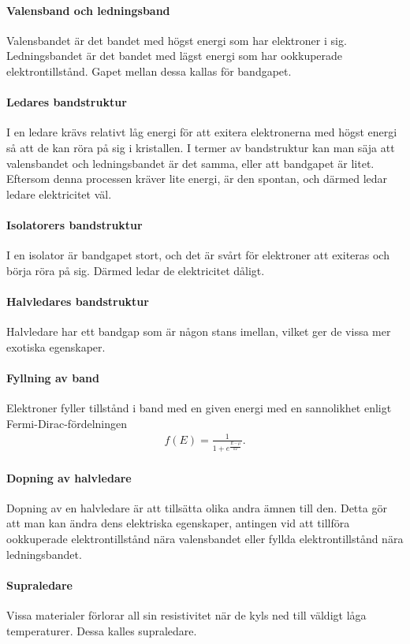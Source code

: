 \paragraph{Valensband och ledningsband}
Valensbandet är det bandet med högst energi som har elektroner i sig. Ledningsbandet är det bandet med lägst energi som har ookkuperade elektrontillstånd. Gapet mellan dessa kallas för bandgapet.

\paragraph{Ledares bandstruktur}
I en ledare krävs relativt låg energi för att exitera elektronerna med högst energi så att de kan röra på sig i kristallen. I termer av bandstruktur kan man säja att valensbandet och ledningsbandet är det samma, eller att bandgapet är litet. Eftersom denna processen kräver lite energi, är den spontan, och därmed ledar ledare elektricitet väl.

\paragraph{Isolatorers bandstruktur}
I en isolator är bandgapet stort, och det är svårt för elektroner att exiteras och börja röra på sig. Därmed ledar de elektricitet dåligt.

\paragraph{Halvledares bandstruktur}
Halvledare har ett bandgap som är någon stans imellan, vilket ger de vissa mer exotiska egenskaper.

\paragraph{Fyllning av band}
Elektroner fyller tillstånd i band med en given energi med en sannolikhet enligt Fermi-Dirac-fördelningen
\begin{align*}
	f(E) = \frac{1}{1 + e^{\frac{E - \mu}{kT}}}.
\end{align*}

\paragraph{Dopning av halvledare}
Dopning av en halvledare är att tillsätta olika andra ämnen till den. Detta gör att man kan ändra dens elektriska egenskaper, antingen vid att tillföra ookkuperade elektrontillstånd nära valensbandet eller fyllda elektrontillstånd nära ledningsbandet.

\paragraph{Supraledare}
Vissa materialer förlorar all sin resistivitet när de kyls ned till väldigt låga temperaturer. Dessa kalles supraledare.